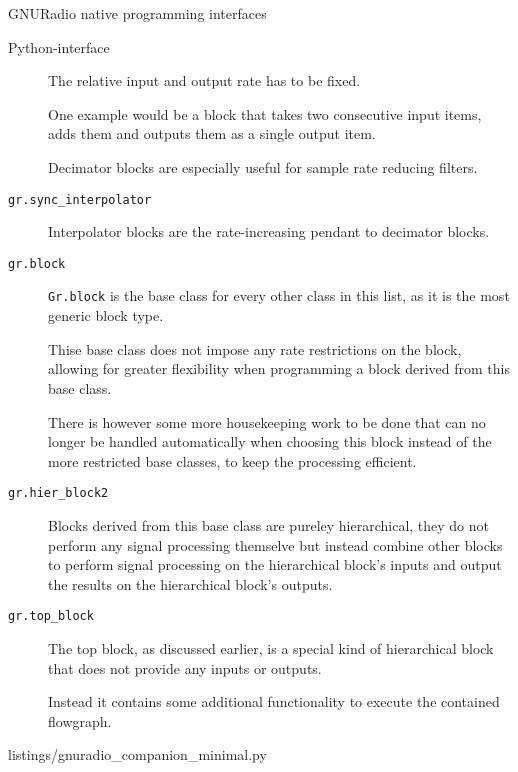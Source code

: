 \begin{subchapter}{GNURadio native programming interfaces}
\begin{subsubchapter}{Python-interface}
\begin{description}
        The relative input and output rate has to be fixed.

        One example would be a block that takes two consecutive input
        items, adds them and outputs them as a single output item.

        Decimator blocks are especially useful for
        sample rate reducing filters.

      \item[\texttt{gr.sync\_interpolator}]
        Interpolator blocks are the rate-increasing pendant
        to decimator blocks.

      \item[\texttt{gr.block}]
        \texttt{Gr.block} is the base class for every other class
        in this list, as it is the most generic block type.

        Thise base class does not impose any rate restrictions
        on the block, allowing for greater flexibility when
        programming a block derived from this base class.

        There is however some more housekeeping work to be
        done that can no longer be handled automatically when
        choosing this block instead of the more restricted base classes,
        to keep the processing efficient.

      \item[\texttt{gr.hier\_block2}]
        Blocks derived from this base class are pureley
        hierarchical, they do not perform any signal processing
        themselve but instead combine other blocks to perform
        signal processing on the hierarchical block's inputs and
        output the results on the hierarchical block's outputs.

      \item[\texttt{gr.top\_block}]
        The top block, as discussed earlier, is a special kind of
        hierarchical block that does not provide any inputs or outputs.

        Instead it contains some additional functionality to execute
        the contained flowgraph.
    \end{description}

    \begin{minipage}{\linewidth}
      
                      {listings/gnuradio_companion_minimal.py}
    \end{minipage}
  \end{subsubchapter}


\end{subchapter}
